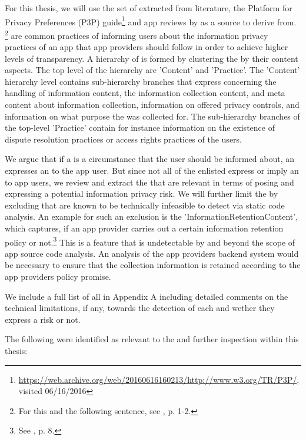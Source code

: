 
For this thesis, we will use the set of \ipp extracted from literature, the Platform for Privacy Preferences (\acs{P3P}) guide\footnote{\url{https://web.archive.org/web/20160616160213/http://www.w3.org/TR/P3P/}, visited 06/16/2016} and app reviews by \cite{Dehling2016} as a source to derive \iprfs from. \footnote{For this and the following sentence, see \cite{Dehling2016}, p. 1-2.} 
\Ipp are common practices of informing users about the information privacy practices of an app that app providers should follow in order to achieve higher levels of transparency.
A hierarchy of \ipp is formed by clustering the \ipp by their content aspects. 
The top level of the hierarchy are 'Content' and 'Practice'.
The 'Content' hierarchy level contains sub-hierarchy branches that express \ipp concerning the handling of information content, the information collection content, and meta content about information collection, information on offered privacy controls, and information on what purpose the \ipp was collected for.
The sub-hierarchy branches of the top-level 'Practice' contain for instance information on the existence of dispute resolution practices or access rights practices of the users.

We argue that if a \ipp is a circumstance that the user should be informed about, an \ipp expresses an \ipr to the app user.
But since not all of the enlisted \ipp express or imply an \ipr to app users, we review and extract the \ipp that are relevant in terms of posing and expressing a potential information privacy risk.
We will further limit the \ipp by excluding \ipp that are known to be technically infeasible to detect via static code analysis.
An example for such an exclusion is the \ipp 'InformationRetentionContent', which captures, if an app provider carries out a certain information retention policy or not.\footnote{See \cite{Dehling2016}, p. 8.}
This is a feature that is undetectable by \sca and beyond the scope of app source code analysis.
An analysis of the app providers backend system would be necessary to ensure that the collection information is retained according to the app providers policy promise.

We include a full list of all \ipp in Appendix A including detailed comments on the technical limitations, if any, towards the \sca detection of each \ipp and wether they express a risk or not.

The following \ipp were identified as relevant to the \sca and further inspection within this thesis:

